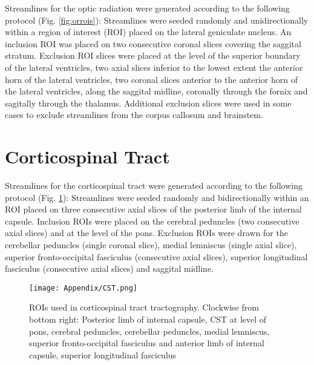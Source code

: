 Streamlines for the optic radiation were generated according to the following protocol (Fig. \ref{fig:orrois}):
Streamlines were seeded randomly and unidirectionally within a region of interest (ROI) placed on the lateral geniculate nucleus.
An inclusion ROI was placed on two consecutive coronal slices covering the saggital stratum.
Exclusion ROI slices were placed at the level of the superior boundary of the lateral ventricles, two axial slices inferior to the lowest extent the anterior horn of the lateral ventricles, two coronal slices anterior to the anterior horn of the lateral ventricles, along the saggital midline, coronally through the fornix and sagitally through the thalamus.
Additional exclusion slices were used in some cases to exclude streamlines from the corpus callosum and brainstem.



\section{Corticospinal Tract}

Streamlines for the corticospinal tract were generated according to the following protocol (Fig. \ref{fig:cstrois}):
Streamlines were seeded randomly and bidirectionally within an ROI placed on three consecutive axial slices of the posterior limb of the internal capsule.
Inclusion ROIs were placed on the cerebral peduncles (two consecutive axial slices) and at the level of the pons.
Exclusion ROIs were drawn for the cerebellar peduncles (single coronal slice), medial lemniscus (single axial slice), superior fronto-occipital fasciculus (consecutive axial slices), superior longitudinal fasciculus (consecutive axial slices) and saggital midline.



\begin{figure}[htbp]
  \centering
  \texttt{[image: Appendix/CST.png]}
  \caption{ROIs used in corticospinal tract tractography. Clockwise from bottom right: Posterior limb of internal capsule, CST at level of pons, cerebral peduncles, cerebellar peduncles, medial lemniscus, superior fronto-occipital fasciculus and anterior limb of internal capsule, superior longitudinal fasciculus}\label{fig:cstrois}
\end{figure}




